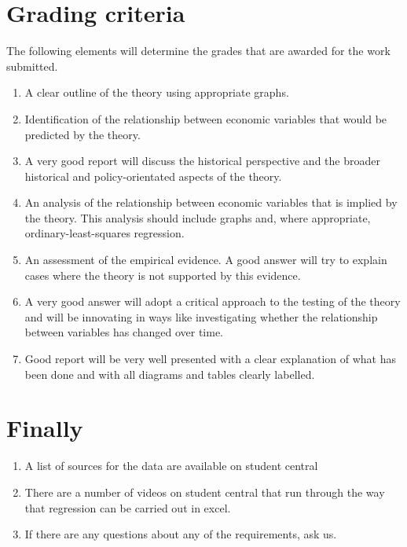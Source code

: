 \documentclass[12pt, a4paper, oneside]{article}\usepackage{graphicx, color}
\begin{document}
\section*{Grading criteria}
The following elements will determine the grades that are awarded for the work submitted. 

\begin{enumerate}
\item A clear outline of the theory using appropriate graphs.
\item Identification of the relationship between economic variables that would be predicted by the theory. 
\item A very good report will discuss the historical perspective and the broader historical and policy-orientated aspects of the theory.
\item An analysis of the relationship between economic variables that is implied by the theory. This analysis should include graphs and, where appropriate, ordinary-least-squares regression. 
\item An assessment of the empirical evidence.  A good answer will try to explain cases where the theory is not supported by this evidence. 
\item A very good answer will adopt a critical approach to the testing of the theory and will be innovating in ways like investigating whether the relationship between variables has changed over time. 
\item Good report will be very well presented with a clear explanation of what has been done and with all diagrams and tables clearly labelled. 
\end{enumerate}

\section*{Finally}
\begin{enumerate}
\item A list of sources for the data are available on student central
\item There are a number of videos on student central that run through the way that regression can be carried out in excel. 
\item If there are any questions about any of the requirements, ask us.
\end{enumerate}
\end{document}
